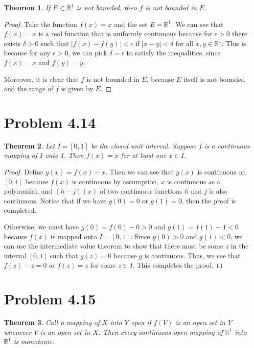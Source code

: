 \documentclass[psamsfonts]{amsart}
\newtheorem{thm}{Theorem}[section]
\theoremstyle{definition}
\theoremstyle{remark}
\numberwithin{equation}{section}
\begin{document}
\begin{thm}
If $E \subset \mathbb{R}^1$ is not bounded, then $f$ is not bounded in $E$. 
\end{thm}

\begin{proof}
Take the function $f(x) = x$ and the set $E = \mathbb{R}^1$. We can see that $f(x) = x$ is a real function that is uniformly continuous because for $\epsilon > 0$ there exists $\delta > 0$ such that $|f(x) - f(y)| < \epsilon$ if $|x - y| < \delta$ for all $x,y \in \mathbb{R}^1$. This is because for any $\epsilon > 0$, we can pick $\delta = \epsilon$ to satisfy the inequalities, since $f(x) = x$ and $f(y) = y$. 

Moreover, it is clear that $f$ is not bounded in $E$, because $E$ itself is not bounded and the range of $f$ is given by $E$.  
\end{proof}

\section{Problem 4.14}

\begin{thm}
Let $I = [0,1]$ be the closed unit interval. Suppose $f$ is a continuous mapping of $I$ onto $I$. Then $f(x) = x$ for at least one $x \in I$. 
\end{thm}

\begin{proof}
Define $g(x) = f(x) - x$. Then we can see that $g(x)$ is continuous on $[0,1]$ because $f(x)$ is continuous by assumption, $x$ is continuous as a polynomial, and $(h-j)(x)$ of two continuous functions $h$ and $j$ is also continuous. Notice that if we have $g(0) = 0$ or $g(1) = 0$, then the proof is completed.

Otherwise, we must have $g(0) = f(0) - 0 > 0$ and $g(1) = f(1) - 1 < 0$ because $f(x)$ is mapped onto $I = [0,1]$. Since $g(0) > 0$ and $g(1) < 0$, we can use the intermediate value theorem to show that there must be some $z$ in the interval $[0,1]$ such that $g(z) = 0$ because $g$ is continuous. Thus, we see that $f(z) - z = 0$ or $f(z) = z$ for some $z \in I$. This completes the proof.
\end{proof}

\section{Problem 4.15}

\begin{thm}
Call a mapping of $X$ into $Y$ open if $f(V)$ is an open set in $Y$ whenever $V$ is an open set in $X$. Then every continuous open mapping of $\mathbb{R}^1$ into $\mathbb{R}^1$ is monotonic.
\end{thm}
\end{document}
